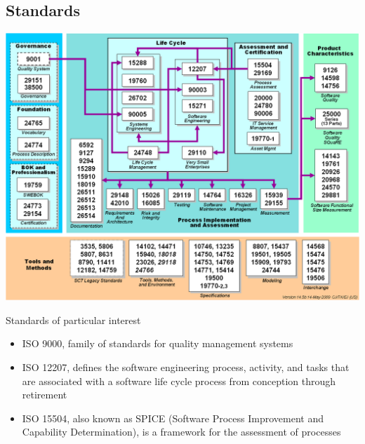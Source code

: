 \documentclass{article}[18pt]
\begin{document}
\subsection{Standards}
\begin{center}
	\includegraphics[scale=0.7]{Standards1}
\end{center}
Standards of particular interest
\begin{itemize}
	\item ISO 9000, family of standards for quality management systems
	\item ISO 12207, defines the software engineering process, activity, and tasks that are associated with a software life cycle process from conception through retirement
	\item ISO 15504, also known as SPICE (Software Process Improvement and Capability Determination), is a framework for the assessment of processes
\end{itemize}
\end{document}
